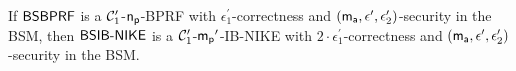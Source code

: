 \begin{theorem}
\label{thm:bsm-ibnike-security}
If $\mathsf{BSBPRF}$ is a $\mathcal{C}_1^{\prime}$-$\mathsf{n_p}$-BPRF with $\epsilon_1^{\prime}$-correctness and $(\mathsf{m_a}, \epsilon^{\prime}, \epsilon_2^{\prime})$-security in the BSM, then $\mathsf{BSIB\text{-}NIKE}$ is a $\mathcal{C}_1^{\prime}$-$\mathsf{m_p}'$-IB-NIKE with $2\cdot\epsilon_1^{\prime}$-correctness and $(\mathsf{m_a}, \epsilon^{\prime}, \epsilon_2^{\prime})$-security in the BSM.
\end{theorem}
